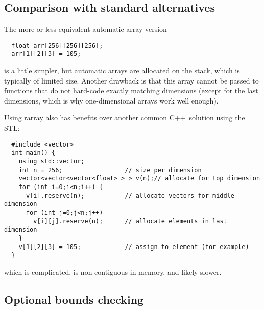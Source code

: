 \documentclass[12pt,twoside]{article}
\newcommand{\cxx}{C{++}}
\begin{document}
\subsection{Comparison with standard alternatives}

The more-or-less equivalent automatic array version 
\vspace{-5pt}\begin{framed}\vspace{-14pt}%
\begin{verbatim}
  float arr[256][256][256]; 
  arr[1][2][3] = 105;
\end{verbatim}
\vspace{-14pt}\end{framed}
\noindent
is a little simpler, but automatic arrays are allocated on the stack,
which is typically of limited size. Another drawback is that this array cannot be passed to functions that do
not hard-code exactly matching dimensions (except for the last
dimensions, which is why one-dimensional arrays work well enough).

Using rarray also has benefits over another common \cxx\ 
solution using the STL:
\vspace{-5pt}\begin{framed}\vspace{-14pt}%
\begin{verbatim}
  #include <vector>
  int main() {
    using std::vector;
    int n = 256;                 // size per dimension
    vector<vector<vector<float> > > v(n);// allocate for top dimension
    for (int i=0;i<n;i++) {
      v[i].reserve(n);           // allocate vectors for middle dimension
      for (int j=0;j<n;j++) 
        v[i][j].reserve(n);      // allocate elements in last dimension
    }
    v[1][2][3] = 105;            // assign to element (for example)
  }
\end{verbatim}
\vspace{-14pt}\end{framed}\vspace{-8pt}
\noindent
which is complicated, is non-contiguous in memory, and likely
slower. 

\subsection{Optional bounds checking}
\end{document}
